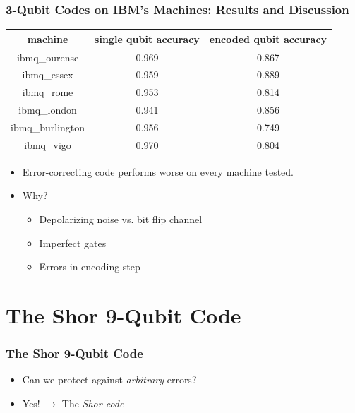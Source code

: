 \documentclass{beamer}
\begin{document}
\begin{frame}
    \frametitle{3-Qubit Codes on IBM's Machines: Results and Discussion}
    \begin{center}
        \begin{tabular}{ |c|c|c| } 
         \hline
         \textbf{machine} & single qubit accuracy & encoded qubit accuracy \\\hline\hline
         ibmq\_ourense & 0.969 & 0.867 \\ 
         ibmq\_essex & 0.959 & 0.889 \\
         ibmq\_rome & 0.953 & 0.814 \\
         ibmq\_london & 0.941 & 0.856 \\
         ibmq\_burlington & 0.956 & 0.749 \\ 
         ibmq\_vigo & 0.970 & 0.804 \\
         \hline
        \end{tabular}
    \end{center}

    \begin{itemize}
        \item Error-correcting code performs worse on every machine tested.
        \item Why?
        \begin{itemize}
            \item Depolarizing noise vs. bit flip channel
            \item Imperfect gates
            \item Errors in encoding step 
        \end{itemize}
    \end{itemize}
\end{frame}


\section{The Shor 9-Qubit Code}
\begin{frame}
    \frametitle{The Shor 9-Qubit Code}
    \begin{itemize}
        \item<1-> Can we protect against \textit{arbitrary} errors?
        \item<2-> Yes! $\longrightarrow$ The \textit{Shor code}
    \end{itemize}
\end{frame}
\end{document}
